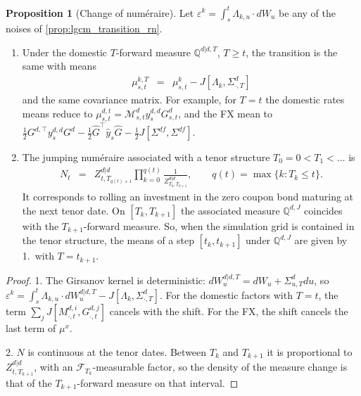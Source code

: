 \documentclass[11pt,english]{amsart}
\newcommand{\QQ}{\mathbb{Q}}
\theoremstyle{definition}
\newtheorem{prop}{Proposition}
\begin{document}
\begin{prop}[Change of num\'eraire]\label{prop:lgcm_drifts}
Let $\varepsilon^k = \int_s^t\Lambda_{k,u}\cdot dW_u$ be any of the noises of \autoref{prop:lgcm_transition_rn}.
\begin{enumerate}
\item Under the domestic $T$-forward measure $\QQ^{d|d,T}$, $T\ge t$, the transition is the same with means
\begin{eqnarray*}
  \mu^{k,T}_{s,t} &=& \mu^{k}_{s,t} - J[\Lambda_k, \Sigma^d_{\cdot,T}]
\end{eqnarray*}
and the same covariance matrix. For example, for $T=t$ the domestic rates means reduce to $\mu^{d,t}_{s,t} = \mathcal{M}^d_{s,t}y^{d,d}_sG^d_{s,t}$, and the FX mean to $\frac{1}{2}G^{d,\top}y^{d,d}_sG^d - \frac{1}{2}\hat{G}^\top\hat{y}_s\hat{G} - \frac{1}{2}J[\Sigma^{df},\Sigma^{df}]$.
\item The jumping num\'eraire associated with a tenor structure $T_0 = 0 < T_1 < \ldots$ is
\begin{eqnarray}
  N_t &=& Z^{d|d}_{t,T_{q(t)+1}} \prod_{k=0}^{q(t)} \frac{1}{Z^{d|d}_{T_k,T_{k+1}}} , \qquad q(t) = \max\{k : T_k\le t\} .
\end{eqnarray}
It corresponds to rolling an investment in the zero coupon bond maturing at the next tenor date. On $[T_k,T_{k+1}]$ the associated measure $\QQ^{d,J}$ coincides with the $T_{k+1}$-forward measure. So, when the simulation grid is contained in the tenor structure, the means of a step $[t_k,t_{k+1}]$ under $\QQ^{d,J}$ are given by 1.\ with $T = t_{k+1}$.
\end{enumerate}
\end{prop}

\begin{proof}
1. The Girsanov kernel is deterministic: $dW^{d|d,T}_u = dW_u + \Sigma^d_{u,T}du$, so $\varepsilon^k = \int_s^t\Lambda_{k,u}\cdot dW^{d|d,T}_u - J[\Lambda_k,\Sigma^d_{\cdot,T}]$. For the domestic factors with $T=t$, the term $\sum_j J[M^{d,i}_{\cdot,t},G^{d,j}_{\cdot,t}]$ cancels with the shift. For the FX, the shift cancels the last term of $\mu^x$.

2. $N$ is continuous at the tenor dates. Between $T_k$ and $T_{k+1}$ it is proportional to $Z^{d|d}_{t,T_{k+1}}$, with an $\mathcal{F}_{T_k}$-measurable factor, so the density of the measure change is that of the $T_{k+1}$-forward measure on that interval.
\end{proof}
\end{document}
